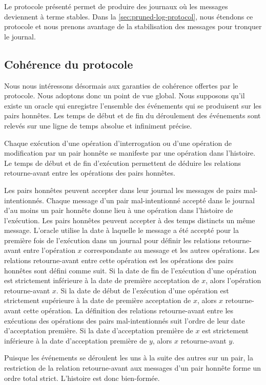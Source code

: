 Le protocole présenté permet de produire des journaux où les messages deviennent à terme stables.
Dans la \autoref{sec:pruned-log-protocol}, nous étendons ce protocole et nous prenons avantage de la stabilisation des messages pour tronquer le journal.


\subsection{Cohérence du protocole}

Nous nous intéressons désormais aux garanties de cohérence offertes par le protocole.
Nous adoptons donc un point de vue global.
Nous supposons qu'il existe un oracle qui enregistre l'ensemble des événements qui se produisent sur les pairs honnêtes.
Les temps de début et de fin du déroulement des événements sont relevés sur une ligne de temps absolue et infiniment précise.

Chaque exécution d'une opération d'interrogation ou d'une opération de modification par un pair honnête se manifeste par une opération dans l'histoire.
Le temps de début et de fin d'exécution permettent de déduire les relations retourne-avant entre les opérations des pairs honnêtes.

Les pairs honnêtes peuvent accepter dans leur journal les messages de pairs mal-intentionnés.
Chaque message d'un pair mal-intentionné accepté dans le journal d'au moins un pair honnête donne lieu à une opération dans l'histoire de l'exécution.
Les pairs honnêtes peuvent accepter à des temps distincts un même message.
L'oracle utilise la date à laquelle le message a été accepté pour la première fois de l'exécution dans un journal pour définir les relations retourne-avant entre l'opération $x$ correspondante au message et les autres opérations.
Les relations retourne-avant entre cette opération est les opérations des pairs honnêtes sont défini comme suit.
Si la date de fin de l'exécution d'une opération est strictement inférieure à la date de première acceptation de $x$, alors l'opération retourne-avant $x$.
Si la date de début de l'exécution d'une opération est strictement supérieure à la date de première acceptation de $x$, alors $x$ retourne-avant cette opération.
La définition des relations retourne-avant entre les exécutions des opérations des pairs mal-intentionnés suit l'ordre de leur date d'acceptation première.
Si la date d'acceptation première de $x$ est strictement inférieure à la date d'acceptation première de $y$, alors $x$ retourne-avant $y$.

Puisque les événements se déroulent les uns à la suite des autres sur un pair, la restriction de la relation retourne-avant aux messages d'un pair honnête forme un ordre total strict.
L'histoire est donc bien-formée.

